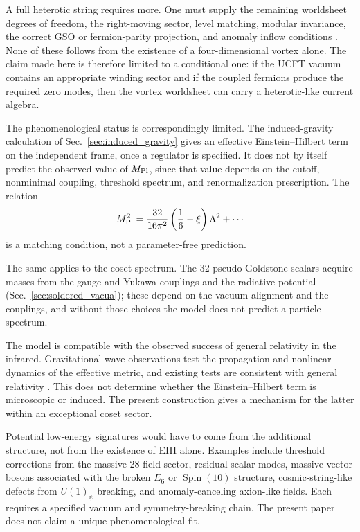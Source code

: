 \documentclass[aps,prd,preprint,longbibliography,nofootinbib,superscriptaddress,floatfix]{revtex4-2}
\newcommand{\Spin}{\operatorname{Spin}}
\begin{document}
A full heterotic string requires more. One must supply the remaining worldsheet
degrees of freedom, the right-moving sector, level matching, modular
invariance, the correct GSO or fermion-parity projection, and anomaly inflow
conditions \cite{GreenSchwarzWitten1,Polchinski2}. None of these follows from
the existence of a four-dimensional vortex alone. The claim made here is
therefore limited to a conditional one: if the UCFT vacuum contains an
appropriate winding sector and if the coupled fermions produce the required
zero modes, then the vortex worldsheet can carry a heterotic-like current
algebra.

The phenomenological status is correspondingly limited. The induced-gravity
calculation of Sec.~\ref{sec:induced_gravity} gives an effective
Einstein--Hilbert term on the independent frame, once a regulator is specified.
It does not by itself predict the observed value of \(M_{\rm Pl}\), since that
value depends on the cutoff, nonminimal coupling, threshold spectrum, and
renormalization prescription. The relation
\begin{equation}
    M_{\rm Pl}^2
    =
    \frac{32}{16\pi^2}
    \left(\frac16-\xi\right)\Lambda^2
    +
    \cdots
    \label{eq:phen_planck_relation}
\end{equation}
is a matching condition, not a parameter-free prediction.

The same applies to the coset spectrum. The \(32\) pseudo-Goldstone scalars
acquire masses from the gauge and Yukawa couplings and the radiative potential
(Sec.~\ref{sec:soldered_vacua}); these depend on the vacuum alignment and the
couplings, and without those choices the model does not predict a particle
spectrum.

The model is compatible with the observed success of general relativity in the
infrared. Gravitational-wave observations test the propagation and nonlinear
dynamics of the effective metric, and existing tests are consistent with
general relativity \cite{LIGOObservation,LIGOTestsGR}. This does not determine
whether the Einstein--Hilbert term is microscopic or induced. The present
construction gives a mechanism for the latter within an exceptional coset
sector.

Potential low-energy signatures would have to come from the additional
structure, not from the existence of EIII alone. Examples include threshold
corrections from the massive \(28\)-field sector, residual scalar modes,
massive vector bosons associated with the broken \(E_6\) or \(\Spin(10)\)
structure, cosmic-string-like defects from \(U(1)_\psi\) breaking, and
anomaly-canceling axion-like fields. Each requires a specified vacuum and
symmetry-breaking chain. The present paper does not claim a unique
phenomenological fit.
\end{document}
